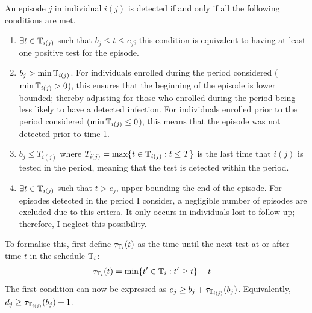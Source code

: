 \documentclass[thesis.tex]{subfiles}
\begin{document}
An episode $j$ in individual $i(j)$ is detected if and only if all the following conditions are met.
\begin{enumerate}
    \item $\exists t \in \mathbb{T}_{i(j)}$ such that $b_j \leq t \leq e_j$; this condition is equivalent to having at least one positive test for the episode.
    \item $b_j > \min \mathbb{T}_{i(j)}$.
      For individuals enrolled during the period considered ($\min \mathbb{T}_{i(j)} > 0$), this ensures that the beginning of the episode is lower bounded; thereby adjusting for those who enrolled during the period being less likely to have a detected infection.
      For individuals enrolled prior to the period considered ($\min \mathbb{T}_{i(j)} \leq 0$), this means that the episode was not detected prior to time 1.
    \item $b_j \leq T_{i(j)}$ where $T_{i(j)} = \max \{ t \in \mathbb{T}_{i(j)} : t \leq T \}$ is the last time that $i(j)$ is tested in the period, meaning that the test is detected within the period.
    \item $\exists t \in \mathbb{T}_{i(j)}$ such that $t > e_j$, upper bounding the end of the episode.
      For episodes detected in the period I consider, a negligible number of episodes are excluded due to this critera.
      It only occurs in individuals lost to follow-up; therefore, I neglect this possibility.
\end{enumerate}

To formalise this, first define $\tau_{\mathbb{T}_i}(t)$ as the time until the next test at or after time $t$ in the schedule $\mathbb{T}_i$:
\begin{align}
\tau_{\mathbb{T}_i}(t) &= \min \{ t' \in \mathbb{T}_i : t' \geq t \} - t
\label{perf-test:eq:tau-def}
\end{align}
The first condition can now be expressed as $e_j \geq b_j + \tau_{\mathbb{T}_{i(j)}}(b_j)$.
Equivalently, $d_j \geq \tau_{\mathbb{T}_{i(j)}}(b_j) + 1$.
\end{document}
